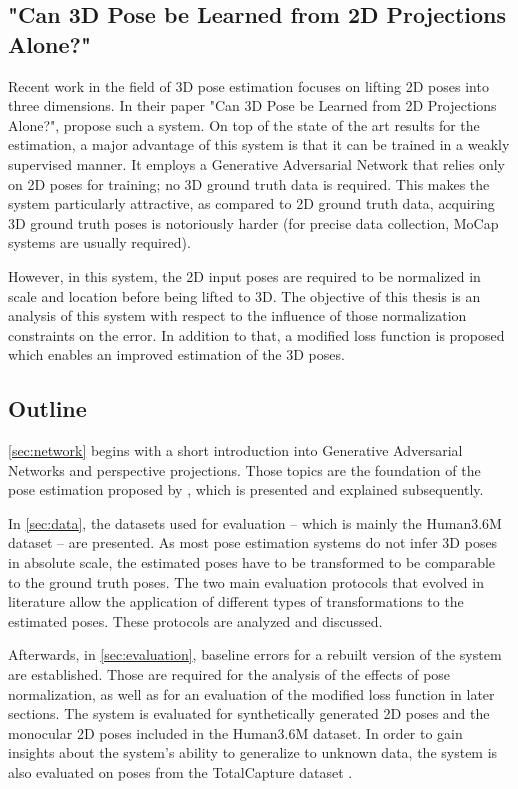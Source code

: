 \subsection{"Can 3D Pose be Learned from 2D Projections Alone?"}

Recent work in the field of 3D pose estimation focuses on lifting 2D poses into three dimensions. 
In their paper "Can 3D Pose be Learned from 2D Projections Alone?", \citet{drover18} propose such a system.
On top of the state of the art results for the estimation, a major advantage of this system is that it can be trained in a weakly supervised manner.
It employs a Generative Adversarial Network \cite{goodfellow14} that relies only on 2D poses for training; no 3D ground truth data is required.
This makes the system particularly attractive, as compared to 2D ground truth data, acquiring 3D ground truth poses is notoriously harder (for precise data collection, MoCap systems are usually required).

However, in this system, the 2D input poses are required to be normalized in scale and location before being lifted to 3D.
The objective of this thesis is an analysis of this system with respect to the influence of those normalization constraints on the error.
In addition to that, a modified loss function is proposed which enables an improved estimation of the 3D poses.

\subsection{Outline}

\autoref{sec:network} begins with a short introduction into Generative Adversarial Networks and perspective projections.
Those topics are the foundation of the pose estimation proposed by \citet{drover18}, which is presented and explained subsequently.

In \autoref{sec:data}, the datasets used for evaluation -- which is mainly the Human3.6M dataset \cite{ionescu14} -- are presented.
As most pose estimation systems do not infer 3D poses in absolute scale, the estimated poses have to be transformed to be comparable to the ground truth poses.
The two main evaluation protocols that evolved in literature allow the application of different types of transformations to the estimated poses.
These protocols are analyzed and discussed.

Afterwards, in \autoref{sec:evaluation}, baseline errors for a rebuilt version of the system are established.
Those are required for the analysis of the effects of pose normalization, as well as for an evaluation of the modified loss function in later sections.
The system is evaluated for synthetically generated 2D poses and the monocular 2D poses included in the Human3.6M dataset.
In order to gain insights about the system's ability to generalize to unknown data, the system is also evaluated on poses from the TotalCapture dataset \cite{trumble17}.

